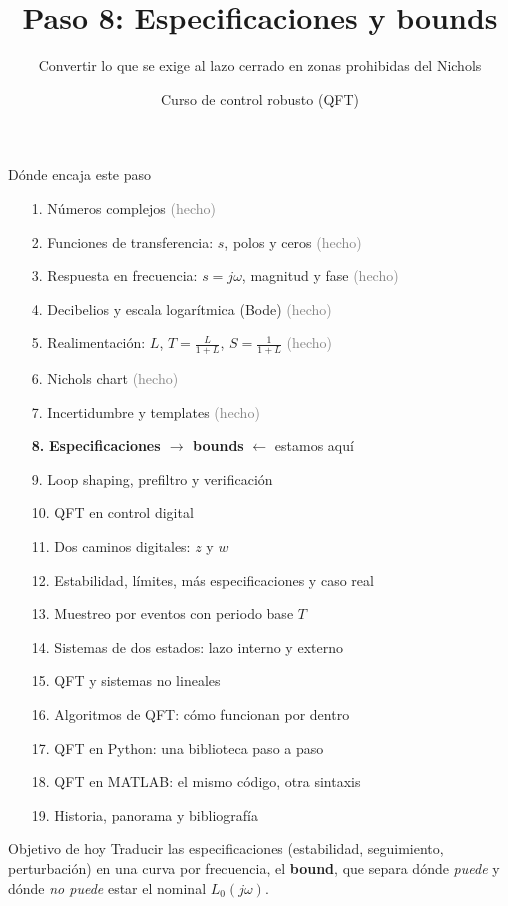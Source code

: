 \documentclass[aspectratio=169,11pt]{beamer}
\title[Especificaciones y bounds]{Paso 8: Especificaciones y bounds}
\subtitle{Convertir lo que se exige al lazo cerrado en zonas prohibidas del Nichols}
\author{Curso de control robusto (QFT)}
\date{}
\begin{document}
\begin{frame}\titlepage\end{frame}

\begin{frame}{Dónde encaja este paso}
  \tiny
  \begin{enumerate}\setlength{\itemsep}{-2pt}
    \item[1.] Números complejos \hfill \textcolor{gray}{(hecho)}
    \item[2.] Funciones de transferencia: $s$, polos y ceros \hfill \textcolor{gray}{(hecho)}
    \item[3.] Respuesta en frecuencia: $s=j\omega$, magnitud y fase \hfill \textcolor{gray}{(hecho)}
    \item[4.] Decibelios y escala logarítmica (Bode) \hfill \textcolor{gray}{(hecho)}
    \item[5.] Realimentación: $L$, $T=\frac{L}{1+L}$, $S=\frac{1}{1+L}$ \hfill \textcolor{gray}{(hecho)}
    \item[6.] Nichols chart \hfill \textcolor{gray}{(hecho)}
    \item[7.] Incertidumbre y templates \hfill \textcolor{gray}{(hecho)}
    \item[\textbf{8.}] \textbf{Especificaciones $\rightarrow$ bounds} \hfill $\leftarrow$ estamos aquí
    \item[9.] Loop shaping, prefiltro y verificación
    \item[10.] QFT en control digital
    \item[11.] Dos caminos digitales: $z$ y $w$
    \item[12.] Estabilidad, límites, más especificaciones y caso real
    \item[13.] Muestreo por eventos con periodo base $T$
    \item[14.] Sistemas de dos estados: lazo interno y externo
    \item[15.] QFT y sistemas no lineales
    \item[16.] Algoritmos de QFT: cómo funcionan por dentro
    \item[17.] QFT en Python: una biblioteca paso a paso
    \item[18.] QFT en MATLAB: el mismo código, otra sintaxis
    \item[19.] Historia, panorama y bibliografía
  \end{enumerate}
  \vspace{2pt}
  \begin{block}{Objetivo de hoy}
    Traducir las especificaciones (estabilidad, seguimiento, perturbación) en una curva por frecuencia, el \textbf{bound}, que separa dónde \emph{puede} y dónde \emph{no puede} estar el nominal $L_0(j\omega)$.
  \end{block}
\end{frame}
\end{document}
